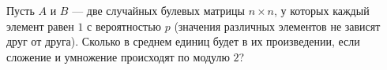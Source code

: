 \documentclass{article}
\begin{document}
Пусть $A$ и $B$ --- две случайных булевых матрицы $n\times n$,
у которых каждый элемент равен $1$ с вероятностью $p$ (значения различных элементов не зависят друг от друга). Сколько в среднем единиц
будет в их произведении, если сложение и умножение происходят по модулю $2$?
\end{document}
